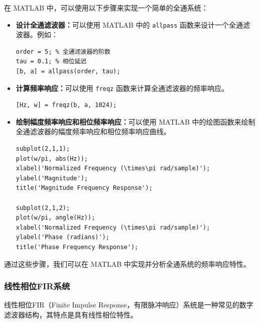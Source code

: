 \documentclass[a4paper,12pt]{article}
\begin{document}
在 MATLAB 中，可以使用以下步骤来实现一个简单的全通系统：
\begin{itemize}
    \item \textbf{设计全通滤波器：}可以使用 MATLAB 中的 \texttt{allpass} 函数来设计一个全通滤波器。例如：
    \begin{lstlisting}
order = 5; % 全通滤波器的阶数
tau = 0.1; % 相位延迟
[b, a] = allpass(order, tau);
    \end{lstlisting}


    \item \textbf{计算频率响应：}可以使用 \texttt{freqz} 函数来计算全通滤波器的频率响应。
    \begin{lstlisting}
[Hz, w] = freqz(b, a, 1024);
    \end{lstlisting}

    \item \textbf{绘制幅度频率响应和相位频率响应：}可以使用 MATLAB 中的绘图函数来绘制全通滤波器的幅度频率响应和相位频率响应曲线。
        \begin{lstlisting}
subplot(2,1,1);
plot(w/pi, abs(Hz));
xlabel('Normalized Frequency (\times\pi rad/sample)');
ylabel('Magnitude');
title('Magnitude Frequency Response');

subplot(2,1,2);
plot(w/pi, angle(Hz));
xlabel('Normalized Frequency (\times\pi rad/sample)');
ylabel('Phase (radians)');
title('Phase Frequency Response');
    \end{lstlisting}
    
\end{itemize}

通过这些步骤，我们可以在 MATLAB 中实现并分析全通系统的频率响应特性。


\subsubsection{线性相位FIR系统}
线性相位FIR（Finite Impulse Response，有限脉冲响应）系统是一种常见的数字滤波器结构，其特点是具有线性相位特性。
\end{document}
